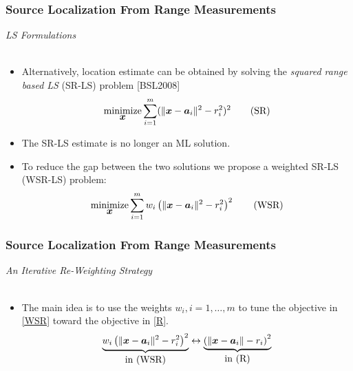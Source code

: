 \documentclass [t] {beamer} %
\begin{document}
\begin{frame}
\frametitle{Source Localization From Range Measurements}
{\large \textit{LS Formulations}} \\~\\
\normalsize
\begin{itemize}
\item 
Alternatively, location estimate can be obtained by solving the \textit{squared range based LS} (SR-LS) problem [BSL2008]
\begin{equation} \label{SR}
\mathop{\mbox{minimize}}_{\mbox{\boldmath$x$}} \sum_{i=1}^{m} (\|{\mbox{\boldmath$x$}} - {\mbox{\boldmath$a$}}_i\|^2 - r_i^2)^2 \tag{SR}
\end{equation}

\item  
The SR-LS estimate is no longer an ML solution.\\%
\item 
To reduce the gap between the two solutions we propose a weighted SR-LS (WSR-LS) problem:
\begin{equation} \label{WSR}
\mathop{\mbox{minimize}}_{\mbox{\boldmath$x$}} \sum_{i=1}^{m} w_i\left(\|{\mbox{\boldmath$x$}} - {\mbox{\boldmath$a$}}_i\|^2 - r_i^2\right)^2 \tag{WSR}
\end{equation}
\end{itemize}
\end{frame}



\begin{frame} %
\frametitle{Source Localization From Range Measurements}
{\large \textit{An Iterative Re-Weighting Strategy}} \\~\\
\normalsize
\begin{itemize}
\phantom{m}
\item 
The main idea is to use the weights ${w_i, i = 1, \ldots, m}$ to tune the objective in \eqref{WSR} toward the objective in \eqref{R}. %
\begin{equation} 
\nonumber
\underbrace{w_i\left(\|\mbox{\boldmath$x$}-\mbox{\boldmath$a$}_i\|^2-r_i^2\right)^2}_{\mbox{in (WSR)}}\leftrightarrow\underbrace{\left(\|\mbox{\boldmath$x$}-\mbox{\boldmath$a$}_i\|-r_i\right)^2}_{\mbox{in (R)}}
\end{equation}
\end{itemize}
\end{frame}
\end{document}
